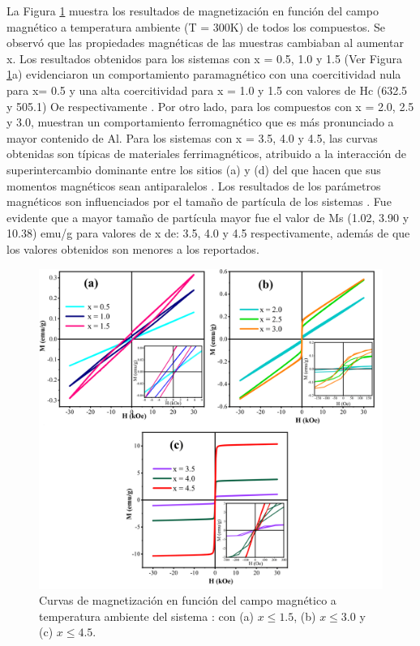 La Figura \ref{fig:magneti} muestra los resultados de magnetización en función del campo
magnético a temperatura ambiente (T = 300K) de todos los compuestos. Se observó
que las propiedades magnéticas de las muestras cambiaban al aumentar x. Los
resultados obtenidos para los sistemas con x = 0.5, 1.0 y 1.5 (Ver Figura
\ref{fig:magneti}a)
evidenciaron un comportamiento paramagnético con una coercitividad nula para x=
0.5
y una alta coercitividad para x = 1.0 y 1.5 con valores de Hc (632.5 y
505.1) Oe respectivamente \cite{musa2017structural}. Por otro lado, para los compuestos con x =
2.0,
2.5 y 3.0, muestran un comportamiento ferromagnético que es más pronunciado a
mayor contenido de Al. Para los sistemas con x = 3.5, 4.0 y 4.5, las curvas
obtenidas son típicas de materiales ferrimagnéticos, atribuido a la interacción
de superintercambio dominante entre los sitios (a) y (d) del  que hacen
que
sus momentos magnéticos sean antiparalelos \cite{yamagishi2005ferrimagnetic}. Los resultados de los
parámetros magnéticos son influenciados por el tamaño de partícula de los
sistemas
\cite{tan2008room}. Fue evidente que a mayor tamaño de partícula mayor fue el valor de Ms
(1.02, 3.90 y 10.38) emu/g para valores de x de: 3.5, 4.0 y 4.5 respectivamente, además de que
los valores obtenidos son menores a los reportados.\\

\begin{figure}[h]
  \centering%

  \includegraphics[width=\textwidth]{Kap6/MH.png}%
  \caption{Curvas de magnetización en función del campo magnético a
  temperatura
  ambiente del sistema :  con (a) $x \leq 1.5$, (b) $x \leq 3.0$ y (c)  $x \leq 4.5$. }\label{fig:magneti}
\end{figure}

